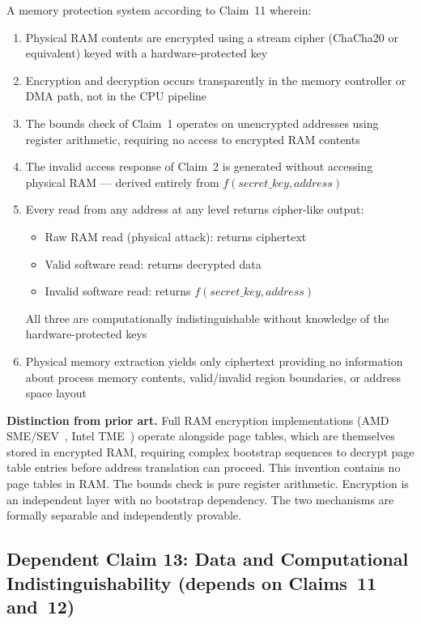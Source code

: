 \documentclass[12pt,letterpaper]{article}
\begin{document}
A memory protection system according to Claim~11 wherein:
\begin{enumerate}[label=(\alph*),noitemsep]
  \item Physical RAM contents are encrypted using a stream cipher
        (ChaCha20 or equivalent) keyed with a hardware-protected key
  \item Encryption and decryption occurs transparently in the memory
        controller or DMA path, not in the CPU pipeline
  \item The bounds check of Claim~1 operates on unencrypted addresses
        using register arithmetic, requiring no access to encrypted
        RAM contents
  \item The invalid access response of Claim~2 is generated without
        accessing physical RAM --- derived entirely from
        $f(\textit{secret\_key}, \textit{address})$
  \item Every read from any address at any level returns cipher-like output:
    \begin{itemize}[noitemsep]
      \item Raw RAM read (physical attack): returns ciphertext
      \item Valid software read: returns decrypted data
      \item Invalid software read: returns $f(\textit{secret\_key},
            \textit{address})$
    \end{itemize}
    All three are computationally indistinguishable without knowledge
    of the hardware-protected keys
  \item Physical memory extraction yields only ciphertext providing no
        information about process memory contents, valid/invalid region
        boundaries, or address space layout
\end{enumerate}

\textbf{Distinction from prior art.}
Full RAM encryption implementations (AMD SME/SEV~\cite{amd_sme},
Intel TME~\cite{intel_tme}) operate alongside page tables, which are
themselves stored in encrypted RAM, requiring complex bootstrap sequences
to decrypt page table entries before address translation can proceed.
This invention contains no page tables in RAM.
The bounds check is pure register arithmetic.
Encryption is an independent layer with no bootstrap dependency.
The two mechanisms are formally separable and independently provable.

\medskip

\subsection*{Dependent Claim 13: Data and Computational Indistinguishability
  (depends on Claims~11 and~12)}
\end{document}
